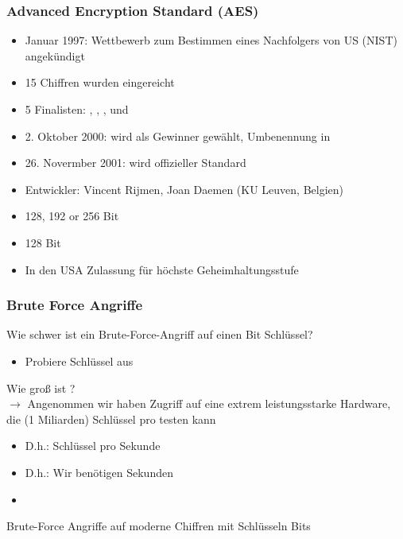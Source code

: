 \subsubsection*{Advanced Encryption Standard (AES)}
\begin{itemize}
    \item Januar 1997: Wettbewerb zum Bestimmen eines Nachfolgers von US  (NIST) angekündigt
    \item 15 Chiffren wurden eingereicht
    \item 5 Finalisten: , , ,  und 
    \item 2. Oktober 2000:  wird als Gewinner gewählt, Umbenennung in 
    \item 26. Novermber 2001:  wird offizieller Standard
    \item Entwickler: Vincent Rijmen, Joan Daemen (KU Leuven, Belgien)
    \item {} 128, 192 or 256 Bit
    \item {} 128 Bit
    \item {} In den USA Zulassung für höchste Geheimhaltungsstufe
\end{itemize}

\subsubsection*{Brute Force Angriffe}
Wie schwer ist ein Brute-Force-Angriff auf einen  Bit Schlüssel?
\begin{itemize}
    \item Probiere  Schlüssel aus
\end{itemize}
Wie groß ist ?\\
$\rightarrow$ 
Angenommen wir haben Zugriff auf eine extrem leistungsstarke Hardware, die  (1 Miliarden) Schlüssel pro  testen kann
\begin{itemize}
    \item D.h.:  Schlüssel pro Sekunde
    \item D.h.: Wir benötigen  Sekunden
    \item {}  
\end{itemize}
 Brute-Force Angriffe auf moderne Chiffren mit Schlüsseln  Bits  

